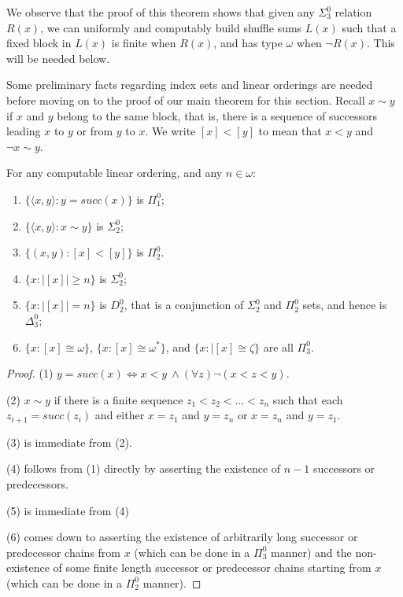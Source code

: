 \documentclass[11pt]{amsart}
\theoremstyle{definition}
\def\la{\langle}
\def\ra{\rangle}
\begin{document}
We observe that the proof of this theorem shows that given any $\Sigma^0_3$ relation $R(x)$, we can uniformly and computably build shuffle sums $L(x)$ such that a fixed block in $L(x)$ is finite when $R(x)$, and has type $\omega$ when $\neg R(x)$. 
This will be needed below.

Some preliminary facts regarding index sets and linear orderings are needed before moving on to the proof of our main theorem for this section. Recall $x \sim y$ if $x$ and $y$ belong to the same block, that is, there is a sequence of successors leading $x$ to $y$ or from $y$ to $x$. We write $[x] < [y]$ to mean that $x < y$ and $\neg x \sim y$. 

\begin{proposition} \label{block1} For any computable linear ordering, and any $n\in\omega$:
\begin{enumerate}
\item $\{\la x,y \ra: y = succ(x)\}$ is $\Pi^0_1$;
\item $\{\la x,y\ra : x \sim y\}$ is $\Sigma^0_2$; 
\item $\{(x,y): [x] < [y]\}$ is $\Pi^0_2$.
\item $\{x: |[x]| \geq n\}$ is $\Sigma^0_2$;
\item $\{x: |[x]| = n\}$ is $D^0_2$, that is a conjunction of $\Sigma^0_2$ and $\Pi^0_2$ sets, and hence is $\Delta^0_3$;
\item $\{x: [x] \cong \omega\}$, $\{x: [x] \cong \omega^*\}$, and
  $\{x: |[x] \cong \zeta\}$ are all $\Pi^0_3$.
\end{enumerate}
\end{proposition}

\begin{proof} (1) $y = succ(x) \iff x < y\ \land (\forall z) \neg (x<z<y)$.

\medskip

(2) $x \sim y$ if there is a finite sequence $z_1 < z_2 < \dots < z_n$ 
such that each $z_{i+1} = succ(z_i)$ and either $x = z_1$ and $y = z_n$ or $x = z_n$ and $y = z_1$. 

(3) is immediate from (2). 

(4) follows from (1) directly by asserting the existence of $n-1$ successors or predecessors. 

(5) is immediate from (4)

(6) comes down to asserting the existence of arbitrarily long successor or predecessor chains from $x$ (which can be done in a $\Pi^0_3$ manner) and the non-existence of some finite length successor or predecessor chains starting from $x$ (which can be done in a $\Pi^0_2$ manner).
\end{proof}
\end{document}
